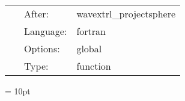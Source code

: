 \hspace{5mm}{\it calculate schwarzschild radius and mass and spherical background } 


\hspace{5mm}

 \begin{tabular*}{160mm}{cll} 
~ & After:  & wavextrl\_projectsphere \\ 
~ & Language:  & fortran \\ 
~ & Options:  & global \\ 
~ & Type:  & function \\ 
\end{tabular*} 



\vspace{5mm}\parskip = 10pt 
